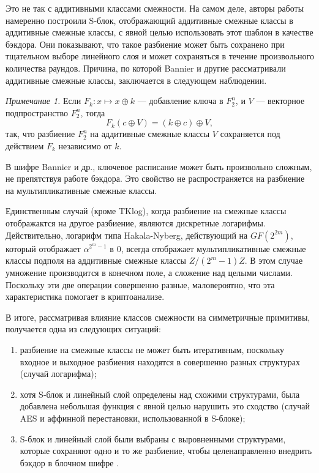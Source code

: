 Это не так с аддитивными классами смежности. На самом деле, авторы работы \cite{BBF16} намеренно построили S-блок, отображающий аддитивные смежные классы в аддитивные смежные классы, с явной целью использовать этот шаблон в качестве бэкдора. Они показывают, что такое разбиение может быть сохранено при тщательном выборе линейного слоя и может сохраняться в течение произвольного количества раундов. Причина, по которой Bannier и другие рассматривали аддитивные смежные классы, заключается в следующем наблюдении.

\textit{Примечание 1.} Если \(F_k: x \mapsto x \oplus k\) — добавление ключа в $F^n_2$, и \(V\) — векторное подпространство $F^n_2$, тогда
\[
F_k(c \oplus V) = (k \oplus c) \oplus V,
\]
так, что разбиение $F^n_2$ на аддитивные смежные классы \(V\) сохраняется под действием \(F_k\) независимо от \(k\).

В шифре Bannier и др., ключевое расписание может быть произвольно сложным, не препятствуя работе бэкдора. Это свойство не распространяется на разбиение на мультипликативные смежные классы.

Единственным случай (кроме TKlog), когда разбиение на смежные классы отображактся на другое разбиение, являются дискретные логарифмы. Действительно, логарифм типа Hakala-Nyberg, действующий на $GF(2^{2m})$, который отображает \(\alpha^{2^m-1}\) в $0$, всегда отображает мультипликативные смежные классы подполя на аддитивные смежные классы $Z/(2^m - 1)Z$. В этом случае умножение производится в конечном поле, а сложение над целыми числами. Поскольку эти две операции совершенно разные, маловероятно, что эта характеристика помогает в криптоанализе.

В итоге, рассматривая влияние классов смежности на симметричные примитивы, получается одна из следующих ситуаций:
\begin{enumerate}
    \item разбиение на смежные классы не может быть итеративным, поскольку входное и выходное разбиения находятся в совершенно разных структурах (случай логарифма);
    \item хотя S-блок и линейный слой определены над схожими структурами, была добавлена небольшая функция с явной целью нарушить это сходство (случай AES и аффинной перестановки, использованной в S-блоке);
    \item S-блок и линейный слой были выбраны с выровненными структурами, которые сохраняют одно и то же разбиение, чтобы целенаправленно внедрить бэкдор в блочном шифре \cite{BBF16}.
\end{enumerate}

